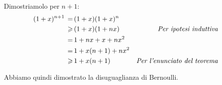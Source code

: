 \documentclass[../dimostrazioni]{subfiles}
\begin{document}
            \medskip

            Dimostriamolo per \(n + 1\):
            \begin{align*}
                (1 + x)^{n + 1} \, =& \, (1 + x)(1 + x)^n\\
                                \geqslant& \, (1 + x)(1 + nx) & \text{\emph{Per ipotesi induttiva}}\\
                                =& \, 1 + nx + x + nx^2\\
                                =& \, 1 + x (n + 1) + nx^2\\
                                \geqslant& \, 1 + x (n + 1) & \text{\emph{Per l'enunciato del teorema}}
            \end{align*}

            Abbiamo quindi dimostrato la disuguaglianza di Bernoulli.
    
\end{document}

